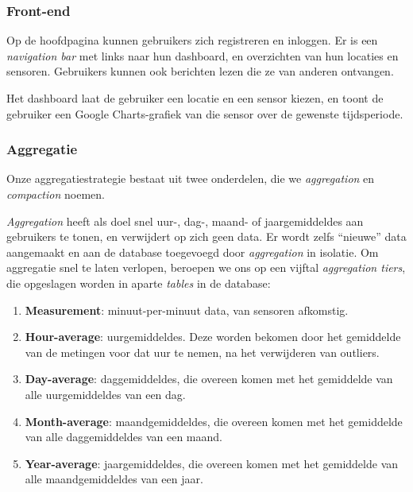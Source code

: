 \documentclass[12pt,parskip=full]{article}
\begin{document}
\subsubsection{Front-end}
Op de hoofdpagina kunnen gebruikers zich registreren en inloggen. Er is een
\textit{navigation bar} met links naar hun dashboard, en overzichten van hun locaties en sensoren. Gebruikers kunnen ook berichten lezen die ze van anderen ontvangen.

Het dashboard laat de gebruiker een locatie en een sensor kiezen, en toont de gebruiker een Google Charts-grafiek van die sensor over de gewenste
tijdsperiode.

\subsubsection{Aggregatie}

Onze aggregatiestrategie bestaat uit twee onderdelen, die we \emph{aggregation} en \emph{compaction} noemen.

\emph{Aggregation} heeft als doel snel uur-, dag-, maand- of jaargemiddeldes aan gebruikers te tonen, en verwijdert op zich geen data. Er wordt zelfs ``nieuwe'' data aangemaakt en aan de database toegevoegd door \emph{aggregation} in isolatie. Om aggregatie snel te laten verlopen, beroepen we ons op een vijftal \emph{aggregation tiers}, die opgeslagen worden in aparte \emph{tables} in de database:

\begin{enumerate}
	\item \textbf{Measurement}: minuut-per-minuut data, van sensoren afkomstig.

	\item \textbf{Hour-average}: uurgemiddeldes. Deze worden bekomen door het gemiddelde van de metingen voor dat uur te nemen, na het verwijderen van outliers.

	\item \textbf{Day-average}: daggemiddeldes, die overeen komen met het gemiddelde van alle uurgemiddeldes van een dag.

	\item \textbf{Month-average}: maandgemiddeldes, die overeen komen met het gemiddelde van alle daggemiddeldes van een maand.

	\item \textbf{Year-average}: jaargemiddeldes, die overeen komen met het gemiddelde van alle maandgemiddeldes van een jaar.
\end{enumerate}
\end{document}
